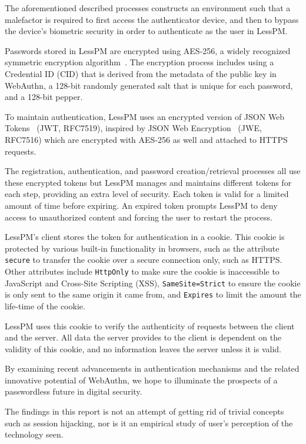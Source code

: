 The aforementioned described processes constructs an environment such that a
malefactor is required to first access the authenticator device, and then
to bypass the device's biometric security in order to authenticate as the user
in LessPM\@.

Passwords stored in LessPM are encrypted using AES-256, a widely recognized
symmetric encryption algorithm~\cite{schneier2000secrets,rijndael_book}.
The encryption process includes using a Credential ID (CID) that is derived from
the metadata of the public key in WebAuthn, a 128-bit randomly generated salt
that is unique for each password, and a 128-bit pepper.

To maintain authentication, LessPM uses an encrypted version of JSON Web
Tokens~\cite{RFC7519} (JWT, RFC7519), inspired by JSON Web
Encryption~\cite{rfc7516} (JWE, RFC7516) which are encrypted with AES-256 as
well and attached to HTTPS requests.

The registration, authentication, and password creation/retrieval processes
all use these encrypted tokens but LessPM manages and maintains different
tokens for each step, providing an extra level of security.
Each token is valid for a limited amount of time before expiring.
An expired token prompts LessPM to deny access to unauthorized content and
forcing the user to restart the process.

LessPM's client stores the token for authentication in a cookie.
This cookie is protected by various built-in functionality in browsers, such as
the attribute \texttt{secure} to transfer the cookie over a secure connection
only, such as HTTPS\@.
Other attributes include \texttt{HttpOnly} to make sure the cookie is
inaccessible to JavaScript and Cross-Site Scripting (XSS),
\texttt{SameSite=Strict} to ensure the cookie is only sent to the same origin
it came from, and \texttt{Expires} to limit the amount the life-time of the
cookie.

LessPM uses this cookie to verify the authenticity of requests between the
client and the server.
All data the server provides to the client is dependent on the validity of
this cookie, and no information leaves the server unless it is valid.

By examining recent advancements in authentication mechanisms and the related
innovative potential of WebAuthn, we hope to illuminate the prospects of a
passwordless future in digital security.

The findings in this report is not an attempt of getting rid of trivial
concepts such as session hijacking, nor is it an empirical study of user's
perception of the technology seen.

